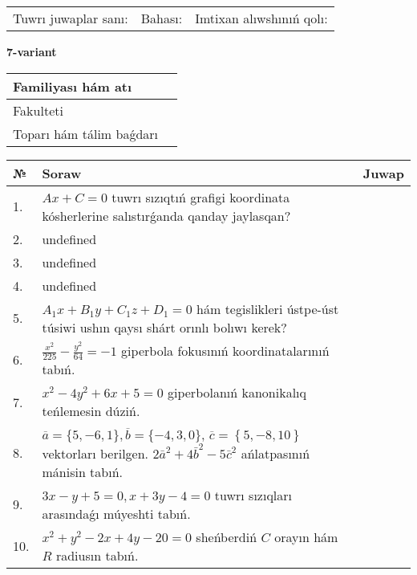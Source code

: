 \documentclass{article}
\begin{document}
\vspace{0.7cm}

\begin{tabular}{lll}
Tuwrı juwaplar sanı: \underline{\hspace{1cm}} & 
Bahası: \underline{\hspace{1cm}} & 
Imtixan alıwshınıń qolı: \underline{\hspace{2cm}} \\
\end{tabular}

\egroup

\newpage


\textbf{7-variant}\\

\bgroup
\def\arraystretch{1.6} %

\begin{tabular}{|m{5.7cm}|m{9.5cm}|}
\hline
Familiyası hám atı & \\
\hline
Fakulteti  & \\
\hline
Toparı hám tálim baǵdarı  & \\
\hline
\end{tabular}

\vspace{0.7cm}

\begin{tabular}{|m{0.7cm}|m{10cm}|m{4cm}|}
\hline
№ & Soraw & Juwap \\
\hline
1. & \(Ax + C = 0\) tuwrı sızıqtıń grafigi koordinata kósherlerine salıstırǵanda qanday jaylasqan? &  \\
\hline
2. & undefined &  \\
\hline
3. & undefined &  \\
\hline
4. & undefined &  \\
\hline
5. & \(A_{1}x + B_{1}y + C_{1}z + D_{1} = 0\) hám tegislikleri ústpe-úst túsiwi ushın qaysı shárt orınlı bolıwı kerek? &  \\
\hline
6. & \(\frac{x^{2}}{225} - \frac{y^{2}}{64} = - 1\) giperbola fokusınıń koordinatalarınıń tabıń. &  \\
\hline
7. & \(x^{2} - 4 y^{2} + 6 x + 5 = 0\) giperbolanıń kanonikalıq teńlemesin dúziń. &  \\
\hline
8. & \(\overline{a} = \{5,- 6, 1 \}, \overline{b} = \{ - 4, 3, 0 \} \), \(\overline{c} = \left\{ 5,- 8, 10 \right\}\) vektorları berilgen. \(2{\bar{a}}^{2} + 4{\bar{b}}^{2} - 5{\bar{c}}^{2}\) ańlatpasınıń mánisin tabıń. &  \\
\hline
9. & \(3 x - y + 5 = 0, x + 3 y - 4 = 0\) tuwrı sızıqları arasındaǵı múyeshti tabıń. &  \\
\hline
10. & \(x^{2} + y^{2} - 2 x + 4 y - 20 = 0\) sheńberdiń \(C\) orayın hám \(R\) radiusın tabıń. & \\
\hline
\end{tabular}
\end{document}
